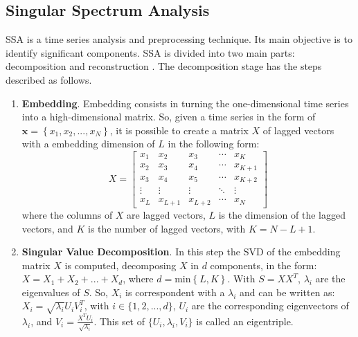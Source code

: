 \subsection{Singular Spectrum Analysis}
\ac{SSA} is a time series analysis and preprocessing technique. Its main objective is to identify significant components. \ac{SSA} is divided into two main parts: decomposition and reconstruction \cite{golyandina2001Analysis, moreno2018Wind, moreno2020Multistep}. The decomposition stage has the steps described as follows.

\begin{enumerate}

\item \textbf{Embedding}. Embedding consists in turning the one-dimensional time series into a high-dimensional matrix. So, given a time series in the form of $\boldsymbol{x}=\left\{ x_{1},x_{2},...,x_{N}\right\}$, it is possible to create a matrix $X$ of lagged vectors with a embedding dimension of $L$ in the following form:
%
\begin{equation}
X=\left[\begin{array}{ccccc}
x_{1} & x_{2} & x_{3} & \cdots & x_{K}\\
x_{2} & x_{3} & x_{4} & \cdots & x_{K+1}\\
x_{3} & x_{4} & x_{5} & \cdots & x_{K+2}\\
\vdots & \vdots & \vdots & \ddots & \vdots\\
x_{L} & x_{L+1} & x_{L+2} & \cdots & x_{N}
\end{array}\right]
\end{equation}
where the columns of $X$ are lagged vectors, $L$ is the dimension of the lagged vectors, and $K$ is the number of lagged vectors, with $K=N-L+1$.

\item \textbf{Singular Value Decomposition}. In this step the \ac{SVD} of the embedding matrix $X$ is computed, decomposing $X$ in $d$ components, in the form: $X=X_{1}+X_{2}+...+X_{d}$, where $d=\text{min}\left\{ L,K\right\}$. With $S=XX^{T}$, $\lambda_{i}$ are the eigenvalues of $S$. So, $X_i$ is correspondent with a $\lambda_{i}$ and can be written as: $X_{i}=\sqrt{\lambda_{i}}U_{i}V_{i}^{T}$, with $i\in\{1,2,...,d\}$, $U_{i}$ are the corresponding eigenvectors of $\lambda_{i}$, and $V_{i}=\frac{X^{T}U_{i}}{\sqrt{\lambda_{i}}}$. This set of $\{U_{i},\lambda_{i},V_{i}\}$ is called an eigentriple.

\end{enumerate}

